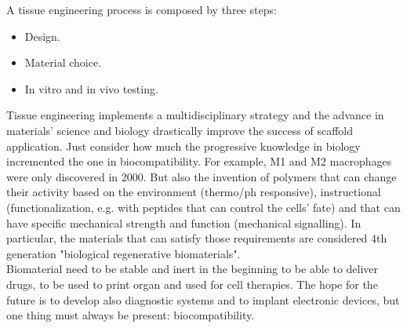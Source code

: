 A tissue engineering process is composed by three steps:

\begin{multicols}{3}
	\begin{itemize}
		\item Design.
		\item Material choice.
		\item In vitro and in vivo testing.
	\end{itemize}
\end{multicols}

Tissue engineering implements a multidisciplinary strategy and the advance in materials' science and biology drastically improve the success of scaffold application.
Just consider how much the progressive knowledge in biology incremented the one in biocompatibility.
For example, M1 and M2 macrophages were only discovered in 2000.
But also the invention of polymers that can change their activity based on the environment (thermo/ph responsive), instructional (functionalization, e.g. with peptides that can control the cells' fate) and that can have specific mechanical strength and function (mechanical signalling).
In particular, the materials that can satisfy those requirements are considered 4th generation "biological regenerative biomaterials".
\\
Biomaterial need to be stable and inert in the beginning to be able to deliver drugs, to be used to print organ and used for cell therapies.
The hope for the future is to develop also diagnostic systems and to implant electronic devices, but one thing must always be present: biocompatibility.


